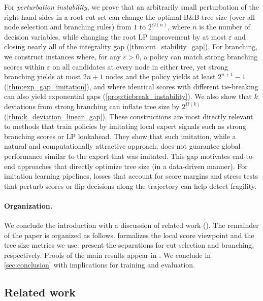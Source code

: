 \documentclass[smallextended,envcountsect]{svjour3} %
\newcommand{\0}{\mathbf{0}}
\newcommand{\1}{\mathbf{1}} %
\begin{document}
For \emph{perturbation instability}, we prove that an arbitrarily small perturbation of the right-hand sides in a root cut set can change the optimal B\&B tree size (over all node selection and branching rules) from $1$ to $2^{\Omega(n)}$, where $n$ is the number of decision variables, while changing the root LP improvement by at most $\varepsilon$ and closing nearly all of the integrality gap (\cref{thm:cut_stability_gap}).
For branching, we construct instances where, for any $\varepsilon>0$, a policy can match strong branching scores within $\varepsilon$ on all candidates at every node in either tree, yet strong branching yields at most $2n+1$ nodes and the policy yields at least $2^{n+1}-1$ (\cref{thm:exp_gap_imitation}), and where identical scores with different tie-breaking can also yield exponential gaps (\cref{prop:tiebreak_instability}). We also show that $k$ deviations from strong branching can inflate tree size by $2^{\Omega(k)}$ (\cref{thm:k_deviation_linear_gap}).
These constructions are most directly relevant to methods that train policies by imitating local expert signals such as strong branching scores or LP lookahead.
They show that such imitation, while a natural and computationally attractive approach, does not guarantee global performance similar to the expert that was imitated.
This gap motivates end-to-end approaches that directly optimize tree size (in a data-driven manner).
For imitation learning pipelines, losses that account for score margins and stress tests that perturb scores or flip decisions along the trajectory can help detect fragility.

\paragraph{Organization.}
We conclude the introduction with a discussion of related work ().
The remainder of the paper is organized as follows.
 formalizes the local score viewpoint and the tree size metrics we use.
 present the separations for cut selection and branching, respectively.
Proofs of the main results appear in .
We conclude in \cref{sec:conclusion} with implications for training and evaluation.

\subsection{Related work}\label{sec:related_work}
\end{document}
